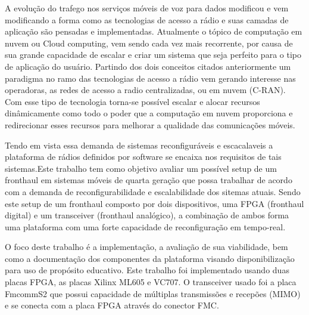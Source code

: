 \documentclass{ufpatcc}
\begin{document}
\begin{ufpaResumo}

A evolu\c{c}\~{a}o do trafego nos servi\c{c}os m\'{o}veis de voz para dados
modificou e vem modificando a forma como as tecnologias de acesso a r\'{a}dio e
suas camadas de aplica\c{c}\~{a}o s\~{a}o pensadas e implementadas. Atualmente o
t\'{o}pico de computa\c{c}\~{a}o em nuvem ou Cloud computing, vem sendo cada vez
mais recorrente, por causa de sua grande capacidade de escalar e criar um
sistema que seja perfeito para o tipo de aplica\c{c}\~{a}o do usu\'{a}rio.
Partindo dos dois conceitos citados anteriormente um paradigma no ramo das
tecnologias de acesso a r\'{a}dio vem gerando interesse nas operadoras, as redes
de acesso a radio centralizadas, ou em nuvem (C-RAN). Com esse tipo de
tecnologia torna-se poss\'{i}vel escalar e alocar recursos din\^{a}micamente como
todo o poder que a computa\c{c}\~{a}o em nuvem proporciona e redirecionar esses
recursos para melhorar a qualidade das comunica\c{c}\~{o}es m\'{o}veis.

Tendo em vista essa  demanda de sistemas reconfigur\'{a}veis e escacalaveis a
plataforma de r\'{a}dios definidos por software se encaixa nos requisitos de
tais sistemas.Este trabalho tem como objetivo avaliar um poss\'{i}vel setup de
um fronthaul em sistemas m\'{o}veis de quarta gera\c{c}\~{a}o que possa
trabalhar de acordo com a demanda de reconfigurabilidade e escalabilidade dos
sitemas atuais. Sendo este setup de um fronthaul composto por dois dispositivos,
uma FPGA (fronthaul digital) e um transceiver (fronthaul anal\'{o}gico), a
combina\c{c}\~{a}o de ambos forma uma plataforma com uma forte capacidade de
reconfigura\c{c}\~{a}o em tempo-real.


O foco deste trabalho \'{e} a implementa\c{c}\~{a}o, a avalia\c{c}\~{a}o de sua
viabilidade, bem como a documenta\c{c}\~{a}o dos componentes da plataforma
visando disponibiliza\c{c}\~{a}o para uso de prop\'{o}sito educativo. Este
trabalho foi implementado usando duas placas FPGA, as placas Xilinx ML605 e
VC707. O transceiver usado foi a placa FmcommS2 que possui capacidade de
m\'{u}ltiplas transmiss\~{o}es e recep\~{o}es (MIMO) e se conecta com a placa FPGA
atrav\'{e}s do conector FMC.


\end{ufpaResumo}
\end{document}
